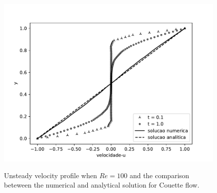 \begin{figure}[H]
     \centering
     \includegraphics[scale=1]{./02_chaps/cap_validation/figure/couette_velocity.pdf}\\
     \medskip
     \caption{Unsteady velocity profile when $Re=100$ and
     the comparison beteween the numerical and analytical solution 
     for Couette flow.}
     \label{velocidade couette}
\end{figure}

\newpage
